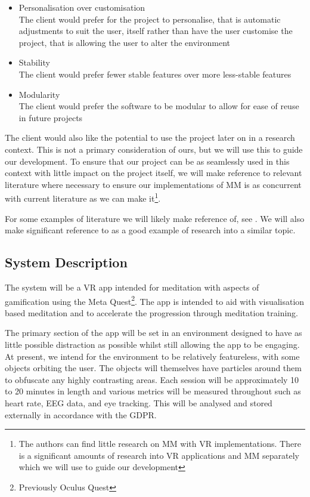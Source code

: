 \documentclass[coverpage,lineno]{../custom}
\begin{document}
\begin{itemize}
	\item Personalisation over customisation\\
	The client would prefer for the project to personalise, that is automatic adjustments to suit the user, itself rather than have the user customise the project, that is allowing the user to alter the environment
	\item Stability\\
	The client would prefer fewer stable features over more less-stable features
	\item Modularity\\
	The client would prefer the software to be modular to allow for ease of reuse in future projects
\end{itemize}

The client would also like the potential to use the project later on in a research context. This is not a primary consideration of ours, but we will use this to guide our development. To ensure that our project can be as seamlessly used in this context with little impact on the project itself, we will make reference to relevant literature where necessary to ensure our implementations of MM is as concurrent with current literature as we can make it\footnote{The authors can find little research on MM with VR implementations. There is a significant amounts of research into VR applications and MM separately which we will use to guide our development}.

For some examples of literature we will likely make reference of, see \cite{kosunen_relaworld_2016, tang_neuroscience_2015, wang_reducing_2022}. We will also make significant reference to \cite{lan_slow_2021} as a good example of research into a similar topic.

\subsection{System Description}
\label{ssec:desc}

The system will be a VR app intended for meditation with aspects of gamification\cite{toda_taxonomy_2019} using the Meta Quest\footnote{Previously Oculus Quest}. The app is intended to aid with visualisation based meditation and to accelerate the progression through meditation training.

The primary section of the app will be set in an environment designed to have as little possible distraction as possible whilst still allowing the app to be engaging. At present, we intend for the environment to be relatively featureless, with some objects orbiting the user. The objects will themselves have particles around them to obfuscate any highly contrasting areas. Each session will be approximately 10 to 20 minutes in length and various metrics will be measured throughout such as heart rate, EEG data, and eye tracking. This will be analysed and stored externally in accordance with the GDPR.
\end{document}
